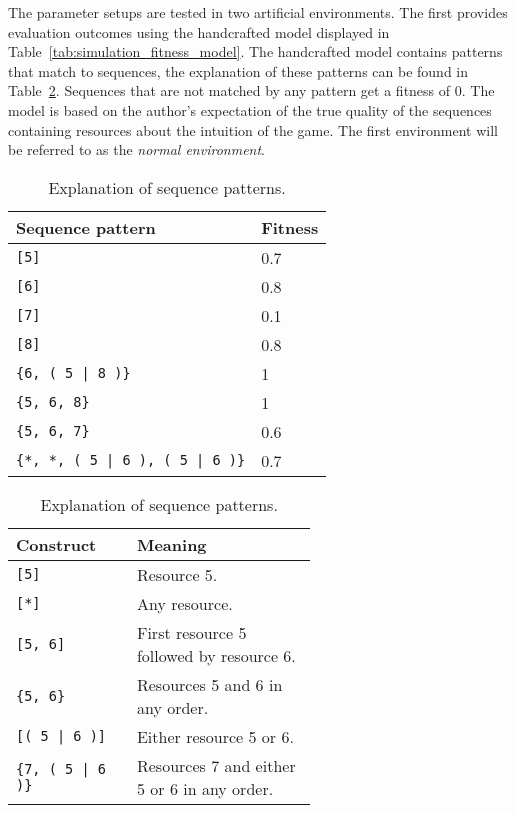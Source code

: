 \noindent
The parameter setups are tested in two artificial environments. The first
provides evaluation outcomes using the handcrafted model displayed in
Table~\ref{tab:simulation_fitness_model}. The handcrafted model contains
patterns that match to sequences, the explanation of these patterns can be
found in Table~\ref{tab:simulation_fitness_model_explanation}. Sequences that
are not matched by any pattern get a fitness of 0.
The model is based on the author's expectation of the true quality of the
sequences containing resources about the intuition of the game. The first
environment will be referred to as the \emph{normal environment}.\\
\begin{table}[h]
\begin{minipage}[t]{0.48\linewidth}
\caption{Fitness values for each sequence.}
\label{tab:simulation_fitness_model}
\begin{tabular}[ht]{ll}\hline
	Sequence pattern & Fitness \\\hline
	\verb![5]! & 0.7 \\
	\verb![6]! & 0.8 \\
	\verb![7]! & 0.1 \\
	\verb![8]! & 0.8 \\
	\verb!{6, ( 5 | 8 )}! & 1 \\
	\verb!{5, 6, 8}! & 1 \\
	\verb!{5, 6, 7}! & 0.6 \\
	\verb!{*, *, ( 5 | 6 ), ( 5 | 6 )}! & 0.7\\
\end{tabular}
\end{minipage}
\hfill
\begin{minipage}[t]{0.51\linewidth}
\caption{Explanation of sequence patterns.}
\label{tab:simulation_fitness_model_explanation}
\begin{tabular}[ht]{lp{0.6\linewidth}}\hline
	Construct &  Meaning \\\hline
	\verb![5]! & Resource 5.\\
	\verb![*]! & Any resource.\\
	\verb![5, 6]! & First resource 5 followed by resource 6.\\
	\verb!{5, 6}! & Resources 5 and 6 in any order.\\
	\verb![( 5 | 6 )]! & Either resource 5 or 6.\\
	\verb!{7, ( 5 | 6 )}! & Resources 7 and either 5 or 6 in any order.\\
\end{tabular}
\end{minipage}
\end{table}\\
